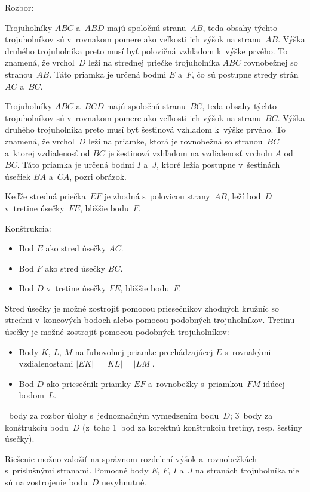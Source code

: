 {%
Rozbor:

Trojuholníky $ABC$ a~$ABD$ majú spoločnú stranu~$AB$, teda obsahy týchto trojuholníkov sú v~rovnakom pomere ako veľkosti ich výšok na stranu~$AB$.
Výška druhého trojuholníka preto musí byť polovičná vzhľadom k~výške prvého.
To znamená, že vrchol~$D$ leží na strednej priečke trojuholníka $ABC$ rovnobežnej so stranou~$AB$.
Táto priamka je určená bodmi $E$ a~$F$, čo sú postupne stredy strán $AC$ a~$BC$.

Trojuholníky $ABC$ a~$BCD$ majú spoločnú stranu~$BC$, teda obsahy týchto trojuholníkov sú v~rovnakom pomere ako veľkosti ich výšok na stranu~$BC$.
Výška druhého trojuholníka preto musí byť šestinová vzhľadom k~výške prvého.
To znamená, že vrchol~$D$ leží na priamke, ktorá je rovnobežná so stranou~$BC$ a~ktorej vzdialenosť od $BC$ je šestinová vzhľadom na vzdialenosť vrcholu $A$ od $BC$.
Táto priamka je určená bodmi $I$ a~$J$, ktoré ležia postupne v~šestinách úsečiek $BA$ a~$CA$, pozri obrázok.

Keďže stredná priečka~$EF$ je zhodná s~polovicou strany~$AB$, leží bod~$D$ v~tretine úsečky~$FE$, bližšie bodu~$F$.
%

Konštrukcia:
\begin{itemize}
\item Bod $E$ ako stred úsečky $AC$.
\item Bod $F$ ako stred úsečky $BC$.
\item Bod $D$ v~tretine úsečky $FE$, bližšie bodu~$F$.
\end{itemize}

Stred úsečky je možné zostrojiť pomocou priesečníkov zhodných kružníc so stredmi v~koncových bodoch alebo pomocou podobných trojuholníkov.
Tretinu úsečky je možné zostrojiť pomocou podobných trojuholníkov:
%

\begin{itemize}
\item Body $K$, $L$, $M$ na ľubovoľnej priamke prechádzajúcej $E$ s~rovnakými vzdialenosťami $|EK|=|KL|=|LM|$.
\item Bod $D$ ako priesečník priamky $EF$ a~rovnobežky s~priamkou~$FM$ idúcej bodom~$L$.
\end{itemize}

~body za rozbor úlohy s~jednoznačným vymedzením bodu~$D$;
3~body za konštrukciu bodu~$D$ (z~toho 1~bod za korektnú konštrukciu tretiny, resp. šestiny úsečky).

\poznamky
Riešenie možno založiť na správnom rozdelení výšok a~rovnobežkách s~príslušnými stranami.
Pomocné body $E$, $F$, $I$ a~$J$ na stranách trojuholníka nie sú na zostrojenie bodu~$D$ nevyhnutné.

}
